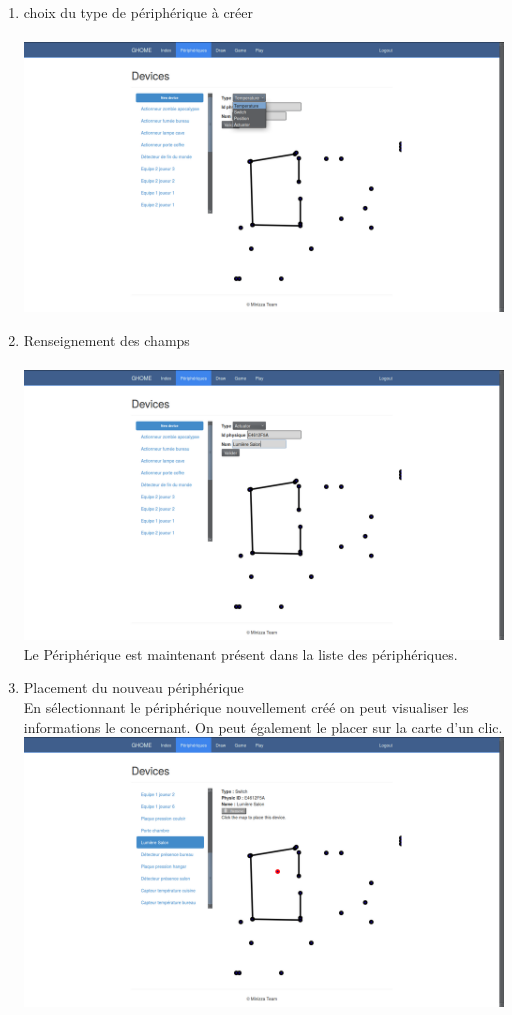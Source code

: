 \begin{enumerate}
\item choix du type de périphérique à créer\\
~~\\
\includegraphics[scale=0.25]{image/periphChoice.png}\\
\item Renseignement des champs \\
~~\\
\includegraphics[scale=0.25]{image/formPeriph.png}\\
Le Périphérique est maintenant présent dans la liste des périphériques.
\item Placement du nouveau périphérique\\
En sélectionnant le périphérique nouvellement créé on peut visualiser les informations le concernant. On peut également le placer sur la carte d'un clic.\\
\includegraphics[scale=0.25]{image/placePeriph.png}
\end{enumerate}

